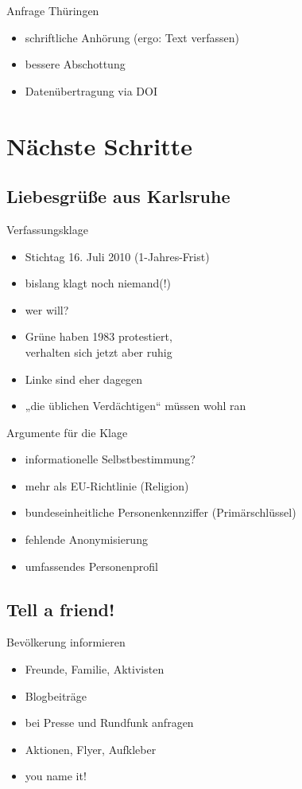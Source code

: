\documentclass[ignorenonframetext,ucs]{beamer}
\begin{document}
\begin{frame}{Anfrage Thüringen}\begin{itemize}
\item schriftliche Anhörung (ergo: Text verfassen)
\item bessere Abschottung
\item Datenübertragung via DOI
\end{itemize}\end{frame}

\section{Nächste Schritte}

\subsection{Liebesgrüße aus Karlsruhe}

\begin{frame}{Verfassungsklage}\begin{itemize}
\item Stichtag 16. Juli 2010 (1-Jahres-Frist)
\item bislang klagt noch niemand(!)
\item wer will?
\item Grüne haben 1983 protestiert,\\verhalten sich jetzt aber ruhig
\item Linke sind eher dagegen
\item „die üblichen Verdächtigen“ müssen wohl ran
\end{itemize}\end{frame}

\begin{frame}{Argumente für die Klage}\begin{itemize}
\item informationelle Selbstbestimmung?
\item mehr als EU-Richtlinie (Religion)
\item bundeseinheitliche Personenkennziffer (Primärschlüssel)
\item fehlende Anonymisierung
\item umfassendes Personenprofil
\end{itemize}\end{frame}

\subsection{Tell a friend!}

\begin{frame}{Bevölkerung informieren}\begin{itemize}
\item Freunde, Familie, Aktivisten
\item Blogbeiträge
\item bei Presse und Rundfunk anfragen
\item Aktionen, Flyer, Aufkleber
\item you name it!
\end{itemize}\end{frame}
\end{document}

